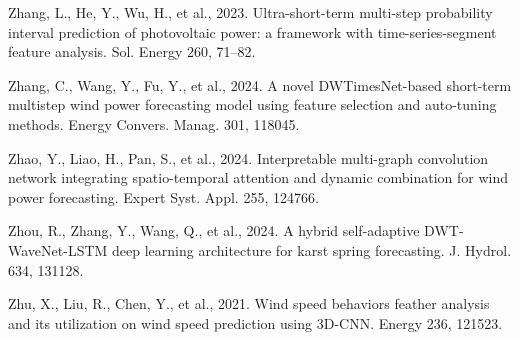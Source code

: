 \documentclass[
  10
]{article}
\begin{document}
Zhang, L., He, Y., Wu, H., et al., 2023. Ultra-short-term multi-step
probability interval prediction of photovoltaic power: a framework with
time-series-segment feature analysis. Sol. Energy 260, 71--82.

Zhang, C., Wang, Y., Fu, Y., et al., 2024. A novel DWTimesNet-based
short-term multistep wind power forecasting model using feature
selection and auto-tuning methods. Energy Convers. Manag. 301, 118045.

Zhao, Y., Liao, H., Pan, S., et al., 2024. Interpretable multi-graph
convolution network integrating spatio-temporal attention and dynamic
combination for wind power forecasting. Expert Syst. Appl. 255, 124766.

Zhou, R., Zhang, Y., Wang, Q., et al., 2024. A hybrid self-adaptive
DWT-WaveNet-LSTM deep learning architecture for karst spring
forecasting. J. Hydrol. 634, 131128.

Zhu, X., Liu, R., Chen, Y., et al., 2021. Wind speed behaviors feather
analysis and its utilization on wind speed prediction using 3D-CNN.
Energy 236, 121523.
\end{document}
